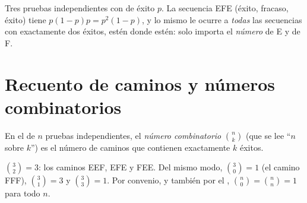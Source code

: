 \begin{example}\label{ex:g11:binom:threetrials}
Tres pruebas independientes con  de éxito $p$. La secuencia
EFE (éxito, fracaso, éxito) tiene  $p(1-p)p = p^2(1-p)$, y lo
mismo le ocurre a \emph{todas} las secuencias con exactamente dos éxitos,
estén donde estén: solo importa el \emph{número} de E y de F.
\end{example}

\section{Recuento de caminos y números combinatorios}

\begin{definition}\label{def:g11:binom:coefficient}
En el  de $n$ pruebas independientes, el \emph{número
combinatorio} $\binom{n}{k}$ (que se lee ``$n$
sobre $k$'') es el número de caminos que contienen exactamente $k$
éxitos.
\end{definition}

\begin{example}
$\binom{3}{2} = 3$: los caminos EEF, EFE y FEE. Del mismo modo,
$\binom{3}{0} = 1$ (el camino FFF), $\binom{3}{1} = 3$ y
$\binom{3}{3} = 1$. Por convenio, y también por el ,
$\binom n0 = \binom nn = 1$ para todo $n$.
\end{example}

